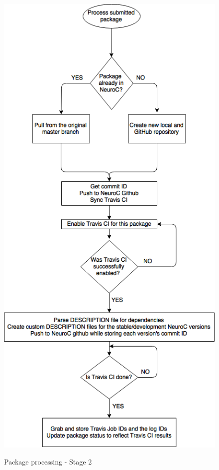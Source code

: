 \documentclass[]{elsarticle} %
\begin{document}
\begin{figure}[!ht]
  \begin{center}
    \caption{Package processing - Stage 2}
    \label{fig:stage2}
    \includegraphics[height=\textheight]{flow_stage2_draft.png}\label{fig:package_lifetime_2}
  \end{center}
\end{figure}
\end{document}
